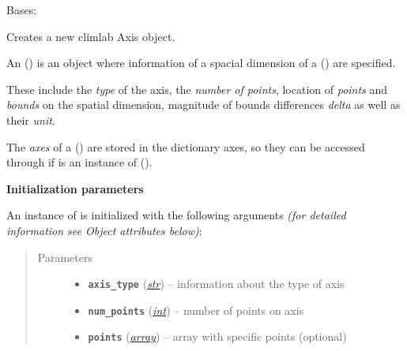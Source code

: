 \documentclass[a4paper,10pt,english]{sphinxmanual}
\begin{document}
\begin{fulllineitems}
\label{api/climlab.domain:climlab.domain.axis.Axis}
Bases: \href{http://docs.python.org/2.7/library/functions.html\#object}{}

Creates a new climlab Axis object.

An {\hyperref[api/climlab.domain:climlab.domain.axis.Axis]{\emph{}}} () is an object where information of a
spacial dimension of a {\hyperref[api/climlab.domain:climlab.domain.domain._Domain]{\emph{}}} () are specified.

These include the \emph{type} of the axis, the \emph{number of points}, location of 
\emph{points} and \emph{bounds} on the spatial dimension, magnitude of bounds
differences \emph{delta} as well as their \emph{unit}.

The \emph{axes} of a {\hyperref[api/climlab.domain:climlab.domain.domain._Domain]{\emph{}}} () are stored in the
dictionary axes, so they can be accessed through  if  
is an instance of {\hyperref[api/climlab.domain:climlab.domain.domain._Domain]{\emph{}}} ().

\textbf{Initialization parameters}

An instance of  is initialized with the following 
arguments \emph{(for detailed information see Object attributes below)}:
\begin{quote}\begin{description}
\item[{Parameters}] \leavevmode\begin{itemize}
\item {} 
\textbf{\texttt{axis\_type}} (\href{http://docs.python.org/2.7/library/functions.html\#str}{\emph{str}}) -- information about the type of axis

\item {} 
\textbf{\texttt{num\_points}} (\href{http://docs.python.org/2.7/library/functions.html\#int}{\emph{int}}) -- number of points on axis

\item {} 
\textbf{\texttt{points}} (\href{http://docs.python.org/2.7/library/array.html\#module-array}{\emph{array}}) -- array with specific points (optional)


\end{itemize}
\end{description}
\end{quote}
\end{fulllineitems}
\end{document}
